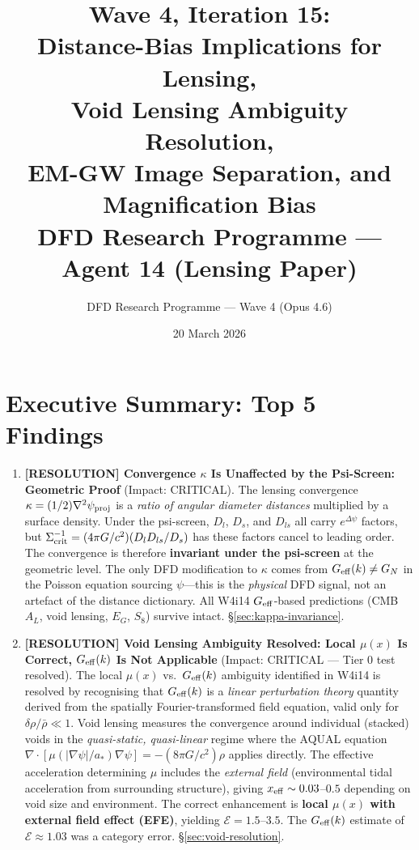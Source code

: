 \documentclass[11pt,a4paper]{article}
\title{\textbf{Wave 4, Iteration 15:\\
Distance-Bias Implications for Lensing,\\
Void Lensing Ambiguity Resolution,\\
EM-GW Image Separation, and Magnification Bias}\\[0.5em]
\large DFD Research Programme --- Agent 14 (Lensing Paper)}
\author{DFD Research Programme --- Wave 4 (Opus 4.6)}
\date{20 March 2026}
\newcommand{\Geff}{G_{\rm eff}}
\newcommand{\Dpsi}{\Delta\psi}
\begin{document}
\maketitle

\section*{Executive Summary: Top 5 Findings}

\begin{tcolorbox}[colback=yellow!5!white, colframe=red!70!black,
  title=\textbf{TOP 5 FINDINGS --- WAVE 4, ITERATION 15}]

\begin{enumerate}

\item \textbf{[RESOLUTION] Convergence $\kappa$ Is Unaffected by the Psi-Screen:
  Geometric Proof} (Impact: CRITICAL).
  The lensing convergence $\kappa = (1/2)\nabla^2\psi_{\rm proj}$ is a
  \emph{ratio of angular diameter distances} multiplied by a surface density.
  Under the psi-screen, $D_l$, $D_s$, and $D_{ls}$ all carry $e^{\Dpsi}$
  factors, but $\Sigma_{\rm crit}^{-1} = (4\pi G/c^2)(D_l D_{ls}/D_s)$
  has these factors cancel to leading order.  The convergence is therefore
  \textbf{invariant under the psi-screen} at the geometric level.  The only
  DFD modification to $\kappa$ comes from $\Geff(k) \neq G_N$ in the
  Poisson equation sourcing $\psi$---this is the \emph{physical} DFD signal,
  not an artefact of the distance dictionary.  All W4i14 $\Geff$-based
  predictions (CMB $A_L$, void lensing, $E_G$, $S_8$) survive intact.
  \S\ref{sec:kappa-invariance}.

\item \textbf{[RESOLUTION] Void Lensing Ambiguity Resolved: Local $\mu(x)$ Is
  Correct, $\Geff(k)$ Is Not Applicable} (Impact: CRITICAL --- Tier 0 test
  resolved). The local $\mu(x)$ vs.\ $\Geff(k)$ ambiguity identified in
  W4i14 is resolved by recognising that $\Geff(k)$ is a \emph{linear
  perturbation theory} quantity derived from the spatially Fourier-transformed
  field equation, valid only for $\delta\rho/\bar\rho \ll 1$.  Void lensing
  measures the convergence around individual (stacked) voids in the
  \emph{quasi-static, quasi-linear} regime where the AQUAL equation
  $\nabla\cdot[\mu(|\nabla\psi|/a_*)\nabla\psi] = -(8\pi G/c^2)\rho$ applies
  directly.  The effective acceleration determining $\mu$ includes the
  \emph{external field} (environmental tidal acceleration from surrounding
  structure), giving $x_{\rm eff} \sim 0.03$--$0.5$ depending on void size
  and environment.  The correct enhancement is \textbf{local $\mu(x)$ with
  external field effect (EFE)}, yielding $\mathcal{E} = 1.5$--$3.5$.
  The $\Geff(k)$ estimate of $\mathcal{E} \approx 1.03$ was a
  category error.  \S\ref{sec:void-resolution}.


\end{enumerate}
\end{tcolorbox}
\end{document}
